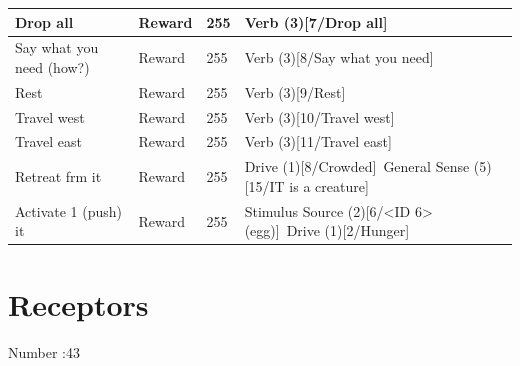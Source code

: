 \documentclass{article}
\begin{document}
\begin{longtable}{|p{3cm}|p{3cm}|p{3cm}|p{8cm}|}
Drop all & Reward & 255 & Verb (3)[7/Drop all]~\newline  \\ \hline
Say what you need (how?) & Reward & 255 & Verb (3)[8/Say what you need]~\newline  \\ \hline
Rest & Reward & 255 & Verb (3)[9/Rest]~\newline  \\ \hline
Travel west & Reward & 255 & Verb (3)[10/Travel west]~\newline  \\ \hline
Travel east & Reward & 255 & Verb (3)[11/Travel east]~\newline  \\ \hline
Retreat frm it & Reward & 255 & Drive (1)[8/Crowded]~\newline General Sense (5)[15/IT is a creature]~\newline  \\ \hline
Activate 1 (push) it & Reward & 255 & Stimulus Source (2)[6/<ID 6> (egg)]~\newline Drive (1)[2/Hunger]~\newline  \\ \hline
\end{longtable}

\newpage

\section*{Receptors}

Number :43
\end{document}
